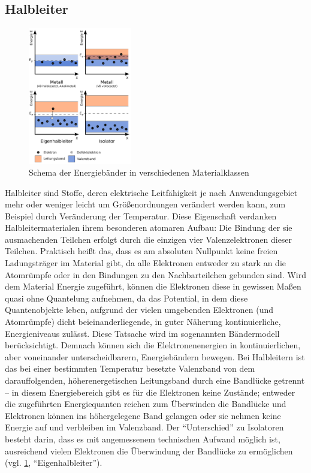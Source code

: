 \documentclass[numbers=noenddot,12pt,a4paper]{scrartcl}
\begin{document}
\subsection{Halbleiter}
\begin{figure}
	\vspace{-3em}
	\includegraphics[width=0.4\textwidth]{ebmde.pdf}
	\caption{Schema der Energiebänder in verschiedenen Materialklassen}
	\label{img:Eniv}
\end{figure}
Halbleiter sind Stoffe, deren elektrische Leitfähigkeit je nach Anwendungsgebiet mehr oder weniger leicht um Größenordnungen verändert werden kann, zum Beispiel durch Veränderung der Temperatur. Diese Eigenschaft verdanken Halbleitermaterialen ihrem besonderen atomaren Aufbau: Die Bindung der sie ausmachenden Teilchen erfolgt durch die einzigen vier Valenzelektronen dieser Teilchen. Praktisch heißt das, dass es am absoluten Nullpunkt keine freien Ladungsträger im Material gibt, da alle Elektronen entweder zu stark an die Atomrümpfe oder in den Bindungen zu den Nachbarteilchen gebunden sind. Wird dem Material Energie zugeführt, können die Elektronen diese in gewissen Maßen quasi ohne Quantelung aufnehmen, da das Potential, in dem diese Quantenobjekte leben, aufgrund der vielen umgebenden Elektronen (und Atomrümpfe) dicht beieinanderliegende, in guter Näherung kontinuierliche, Energieniveaus zulässt. Diese Tatsache wird im sogenannten Bändermodell berücksichtigt. Demnach können sich die Elektronenenergien in kontinuierlichen, aber voneinander unterscheidbarern, Energiebändern bewegen. Bei Halbleitern ist das bei einer bestimmten Temperatur besetzte Valenzband von dem darauffolgenden, höherenergetischen Leitungsband durch eine Bandlücke getrennt -- in diesem Energiebereich gibt es für die Elektronen keine Zustände; entweder die zugeführten Energiequanten reichen zum Überwinden die Bandlücke und Elektronen können ins höhergelegene Band gelangen oder sie nehmen keine Energie auf und verbleiben im Valenzband. Der "`Unterschied"' zu Isolatoren besteht darin, dass es mit angemessenem technischen Aufwand möglich ist, ausreichend vielen Elektronen die Überwindung der Bandlücke zu ermöglichen (vgl. \ref{img:Eniv}, "`Eigenhalbleiter"').
\end{document}
